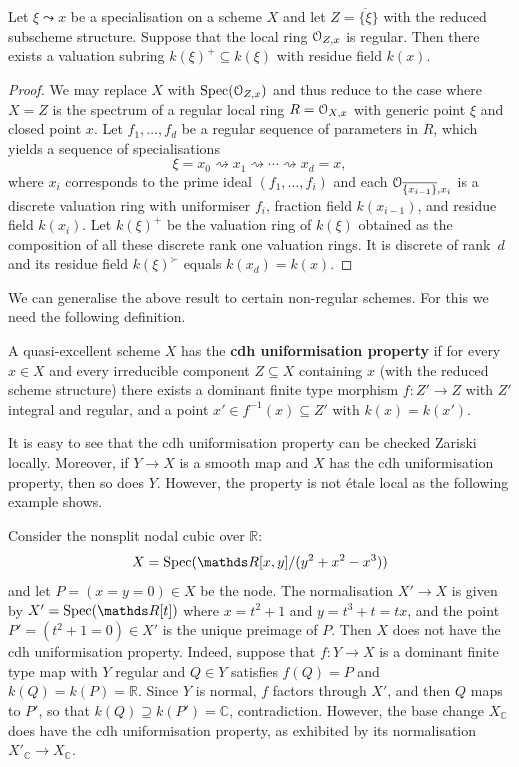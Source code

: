\begin{lem} \label{lem:valuation-on-regular}
    Let $\xi\leadsto x$ be a specialisation on a scheme $X$ and let $Z=\overline{\{\xi}\}$ with the reduced subscheme structure. Suppose that the local ring ${\mathcal O}_{Z,x}$ is regular. Then there exists a valuation subring $k(\xi)^+\subseteq k(\xi)$ with residue field $k(x)$.
\end{lem}

\begin{proof}
We may replace $X$ with $\operatorname{Spec}({\mathcal O}_{Z,x})$ and thus reduce to the case where $X=Z$ is the spectrum of a regular local ring $R={\mathcal O}_{X,x}$ with generic point $\xi$ and closed point $x$. Let $f_1, \ldots, f_d$ be a regular sequence of parameters in $R$, which yields a sequence of specialisations
\[
 \xi = x_0 \rightsquigarrow x_1 \rightsquigarrow \cdots \rightsquigarrow x_d = x,
\]
where $x_i$ corresponds to the prime ideal $(f_1, \dots, f_i)$ and each ${\mathcal O}_{\overline{\{x_{i-1}\}},x_i}$ is a discrete valuation ring with uniformiser $f_i$, fraction field $k(x_{i-1})$, and residue field $k(x_i)$.
Let $k(\xi)^+$ be the valuation ring of $k(\xi)$ obtained as the composition of all these discrete rank one valuation rings.
It is discrete of rank~$d$ and its residue field $k(\xi)^\succ$ equals $k(x_d) = k(x)$.
\end{proof}

We can generalise the above result to certain non-regular schemes. For this we need the following definition.

\begin{defi} \label{def:cdh-unif}
    A quasi-excellent scheme $X$ has the {\bf cdh uniformisation property} if for every $x\in X$ and every irreducible component $Z\subseteq X$ containing $x$ (with the reduced scheme structure) there exists a dominant finite type morphism $f\colon Z'\to Z$ with $Z'$ integral and regular, and a point $x'\in f^{-1}(x)\subseteq Z'$ with $k(x)=k(x')$.
\end{defi}

It is easy to see that the cdh uniformisation property can be checked Zariski locally.
Moreover, if $Y\to X$ is a smooth map and $X$ has the cdh uniformisation property, then so does $Y$.
However, the property is not étale local as the following example shows.

\begin{ex} \label{ex:nodal-curve-noncdh}
    Consider the nonsplit nodal cubic over $\mathbb{R}$:
    \[
        X = \Spec(\mathbb{R}[x,y]/(y^2 + x^2 - x^3))
    \]
    and let $P=(x=y=0)\in X$ be the node. The normalisation $X'\to X$ is given by $X'=\Spec(\mathbb{R}[t])$ where $x=t^2+1$ and $y=t^3+t=tx$, and the point $P'=(t^2+1=0)\in X'$ is the unique preimage of $P$. Then $X$ does not have the cdh uniformisation property. Indeed, suppose that $f\colon Y\to X$ is a dominant finite type map with $Y$ regular and $Q\in Y$ satisfies $f(Q)=P$ and $k(Q)=k(P)=\mathbb{R}$. Since $Y$ is normal, $f$ factors through $X'$, and then $Q$ maps to $P'$, so that $k(Q)\supseteq k(P')=\mathbb{C}$, contradiction. However, the base change $X_\mathbb{C}$ does have the cdh uniformisation property, as exhibited by its normalisation $X'_\mathbb{C}\to X_\mathbb{C}$.
\end{ex}

